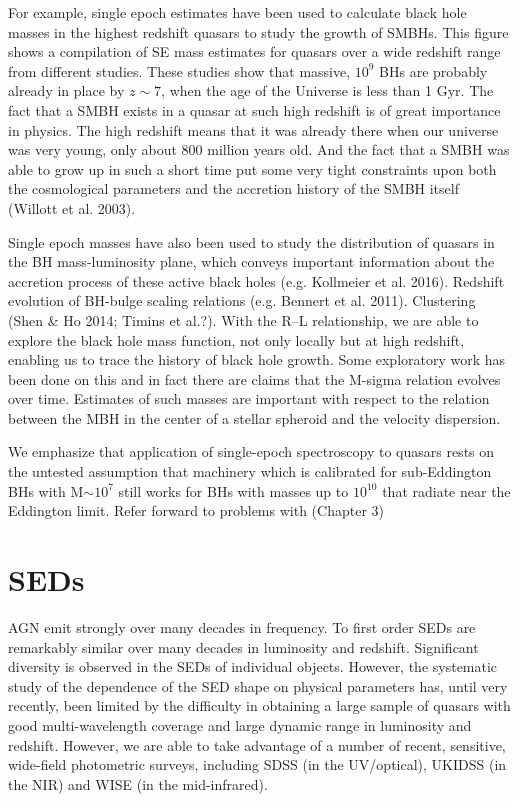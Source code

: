 For example, single epoch estimates have been used to calculate black hole masses in the highest redshift quasars to study the growth of SMBHs. 
This figure shows a compilation of SE mass estimates for quasars over a wide redshift range from different studies. 
These studies show that massive, $10^9$ BHs are probably already in place by $z\sim7$, when the age of the Universe is less than 1 Gyr.
The fact that a SMBH exists in a quasar at such high redshift is of great importance in physics.
The high redshift means that it was already there when our universe was very young, only about
800 million years old. And the fact that a SMBH was able to grow up in such a short time put
some very tight constraints upon both the cosmological parameters and the accretion history of the
SMBH itself (Willott et al. 2003).

Single epoch masses have also been used to study the distribution of quasars in the BH mass-luminosity plane, which conveys important information about the accretion process of these active black holes (e.g. Kollmeier et al. 2016). 
Redshift evolution of BH-bulge scaling relations (e.g. Bennert et al. 2011). 
Clustering (Shen \& Ho 2014; Timins et al.?). 
With the R–L relationship, we are able to explore the black hole mass function, not only locally but at high redshift, enabling us to trace the history of black hole growth.
Some exploratory work has been done on this and in fact there are claims that the M-sigma relation evolves over time. 
Estimates of such masses are important with respect to the relation between the MBH in the center of a stellar spheroid and the velocity dispersion. 

We emphasize that application of single-epoch spectroscopy to quasars rests on the untested assumption that machinery which is calibrated for sub-Eddington BHs with M$\sim10^7$ still works for BHs with masses up to $10^{10}$ that radiate near the Eddington limit. 
Refer forward to problems with  (Chapter 3)

\section{SEDs}

AGN emit strongly over many decades in frequency. 
To first order SEDs are remarkably similar over many decades in luminosity and redshift. 
Significant diversity is observed in the SEDs of individual objects. 
However, the systematic study of the dependence of the SED shape on physical parameters has, until very recently, been limited by the difficulty in obtaining a large sample of quasars with good multi-wavelength coverage and large dynamic range in luminosity and redshift. 
However, we are able to take advantage of a number of recent, sensitive, wide-field photometric surveys, including SDSS (in the UV/optical), UKIDSS (in the NIR) and WISE (in the mid-infrared).

